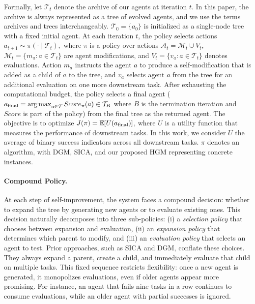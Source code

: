 \documentclass{article} %
\begin{document}
Formally, let $\mathcal{T}_t$ denote the archive of our agents at iteration $t$. In this paper, the archive is always represented as a tree of evolved agents, and we use the terms archives and trees interchangeably.  
$\mathcal{T}_0 = \{a_0\}$ is initialized as a single-node tree with a fixed initial agent.
At each iteration $t$, the policy selects actions $a_{t+1} \sim \pi(\cdot \mid \mathcal{T}_t),$ where $\pi$ is a policy over actions $\mathcal{A}_t = \mathcal{M}_t \cup V_t$, $\mathcal{M}_t = \{m_a : a\in \mathcal{T}_t\}$ are agent modifications, and  $V_t =\{v_a : a\in \mathcal{T}_t\}$ denotes evaluations. 
Action $m_a$ instructs the agent $a$ to produce a self-modification that is added as a child of $a$ to the tree, and $v_a$ selects agent $a$ from the tree for an additional evaluation on one more downstream task.
After exhausting the computational budget, the policy selects a final agent ($a_{\text{final}} = \operatorname*{arg\,max}_{a\in \mathcal{T}}Score_\pi(a) \in \mathcal{T}_B$ where $B$ is the termination iteration and $Score$ is part of the policy) from the final tree as the returned agent.
The objective is to optimize $J(\pi) = \mathbb{E}[U(a_{\text{final}})]$, where $U$ is a utility function that measures the performance of downstream tasks.
In this work, we consider $U$ the average of binary success indicators across all downstream tasks. $\pi$ denotes an algorithm, with DGM, SICA, and our proposed HGM representing concrete instances.

\paragraph{Compound Policy.} At each step of self-improvement, the system faces a compound decision: whether to expand the tree by generating new agents or to evaluate existing ones. This decision naturally decomposes into three sub-policies: (i) a \emph{selection policy} that chooses between expansion and evaluation, (ii) an \emph{expansion policy} that determines which parent to modify, and (iii) an \emph{evaluation policy} that selects an agent to test.  Prior approaches, such as SICA and DGM, conflate these choices. They always expand a parent, create a child, and immediately evaluate that child on multiple tasks. This fixed sequence restricts flexibility: once a new agent is generated, it monopolizes evaluations, even if older agents appear more promising. For instance, an agent that fails nine tasks in a row continues to consume evaluations, while an older agent with partial successes is ignored.
\end{document}
